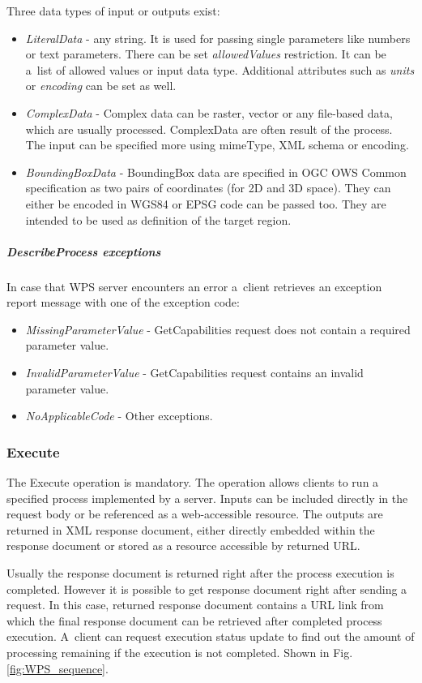 \newpage
\noindent
Three data types of input or outputs exist:
\begin{itemize}
\item\textit{LiteralData} - any string. It is used for passing single parameters like numbers or text parameters. There can be set
\textit{allowedValues} restriction. It can be a~list of allowed values or input data type. Additional attributes such as \textit{units}
or \textit{encoding} can be set as well. 
\item\textit{ComplexData} - Complex data can be raster, vector or any file-based data, which are usually processed. ComplexData
are often result of the process. The input can be specified more using mimeType, XML schema or encoding.
\item\textit{BoundingBoxData} - BoundingBox data are specified in OGC OWS Common specification as two pairs of coordinates (for 2D and 3D space). They can either be encoded in WGS84 or EPSG code can be passed too. They are intended to be used as definition of the target region.
\end{itemize}

\subparagraph{DescribeProcess exceptions}
In case that WPS server encounters an error a~client retrieves an exception report message with one of the exception code:
\begin{itemize}
\item\textit{MissingParameterValue} - GetCapabilities request does not contain a required parameter value.
\item\textit{InvalidParameterValue} - GetCapabilities request contains an invalid parameter value.
\item\textit{NoApplicableCode} - Other exceptions.
\end{itemize}

\subsubsection{Execute}
The Execute operation is mandatory. The operation allows clients to run a specified process implemented by a server.
Inputs can be included directly in the request body or be referenced as a web-accessible resource. The outputs are returned
in XML response document, either directly embedded within the response document or stored as a resource accessible by
returned URL.

Usually the response document is returned right after the process execution is completed. However it is possible to get
response document right after sending a request. In this case, returned response document contains a URL link from which the
final response document can be retrieved after completed process execution. A~client can request execution status update to
find out the amount of processing remaining if the execution is not completed. Shown in Fig. \ref{fig:WPS_sequence}.

